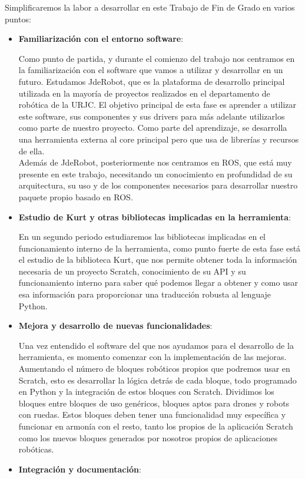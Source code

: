 Simplificaremos la labor a desarrollar en este Trabajo de Fin de Grado en varios puntos:
\begin{itemize}
\item \textbf{Familiarización con el entorno software}: 

Como punto de partida, y durante el comienzo del trabajo nos centramos en la familiarización con el software que vamos a utilizar y desarrollar en un futuro. Estudamos JdeRobot, que es la plataforma de desarrollo principal utilizada en la mayoría de proyectos realizados en el departamento de robótica de la URJC. El objetivo principal de esta fase es aprender a utilizar este software, sus componentes y sus drivers para más adelante utilizarlos como parte de nuestro proyecto. Como parte del aprendizaje, se desarrolla una herramienta externa al core principal pero que usa de librerías y recursos de ella.\\

Además de JdeRobot, posteriormente nos centramos en ROS, que está muy presente en este trabajo, necesitando un conocimiento en profundidad de su arquitectura, su uso y de los componentes necesarios para desarrollar nuestro paquete propio basado en ROS.
\item \textbf{Estudio de Kurt y otras bibliotecas implicadas en la herramienta}: 

En un segundo periodo estudiaremos las bibliotecas implicadas en el funcionamiento interno de la herramienta, como punto fuerte de esta fase está el estudio de la biblioteca Kurt, que nos permite obtener toda la información necesaria de un proyecto Scratch, conocimiento de su API y su funcionamiento interno para saber qué podemos llegar a obtener y como usar esa información para proporcionar una traducción robusta al lenguaje Python.
\item \textbf{Mejora y desarrollo de nuevas funcionalidades}: 

Una vez entendido el software del que nos ayudamos para el desarrollo de la herramienta, es momento comenzar con la implementación de las mejoras. Aumentando el número de bloques robóticos propios que podremos usar en Scratch, esto es desarrollar la lógica detrás de cada bloque, todo programado en Python y la integración de estos bloques con Scratch. Dividimos los bloques entre bloques de uso genéricos, bloques aptos para drones y robots con ruedas. Estos bloques deben tener una funcionalidad muy específica y funcionar en armonía con el resto, tanto los propios de la aplicación Scratch como los nuevos bloques generados por nosotros propios de aplicaciones robóticas.
\item \textbf{Integración y documentación}: 


\end{itemize}
